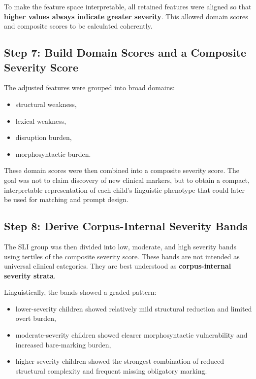 To make the feature space interpretable, all retained features were aligned so that \textbf{higher values always indicate greater severity}. This allowed domain scores and composite scores to be calculated coherently.

\subsection{Step 7: Build Domain Scores and a Composite Severity Score}

The adjusted features were grouped into broad domains:

\begin{itemize}
    \item structural weakness,
    \item lexical weakness,
    \item disruption burden,
    \item morphosyntactic burden.
\end{itemize}

These domain scores were then combined into a composite severity score. The goal was not to claim discovery of new clinical markers, but to obtain a compact, interpretable representation of each child's linguistic phenotype that could later be used for matching and prompt design.

\subsection{Step 8: Derive Corpus-Internal Severity Bands}

The SLI group was then divided into low, moderate, and high severity bands using tertiles of the composite severity score. These bands are not intended as universal clinical categories. They are best understood as \textbf{corpus-internal severity strata}.

Linguistically, the bands showed a graded pattern:

\begin{itemize}
    \item lower-severity children showed relatively mild structural reduction and limited overt burden,
    \item moderate-severity children showed clearer morphosyntactic vulnerability and increased bare-marking burden,
    \item higher-severity children showed the strongest combination of reduced structural complexity and frequent missing obligatory marking.
\end{itemize}

